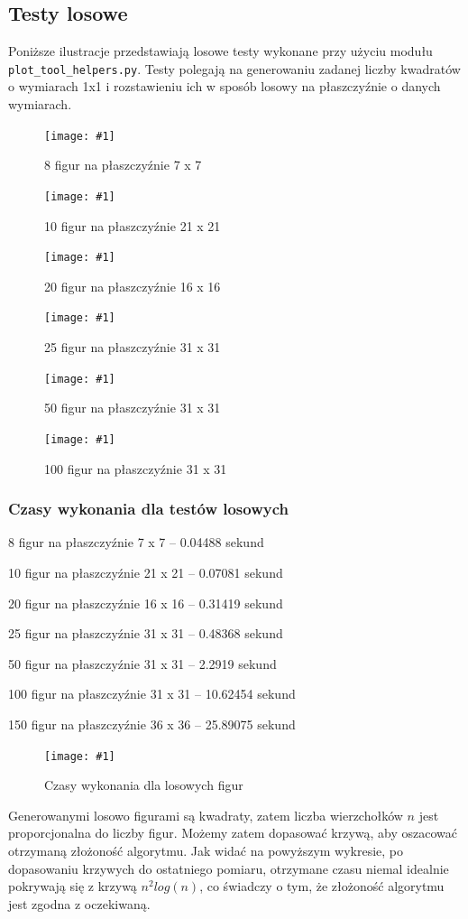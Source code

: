 \documentclass[12pt]{article}
\let\tempone\itemize
\let\temptwo\enditemize
\renewenvironment{itemize}{\tempone\setlength{\itemsep}{0cm}}{\temptwo}
\newcommand{\imgcustomsize}[3]{
	\begin{figure}[H]
		\centering
		\texttt{[image: \#1]}
		\caption{#2}
		\label{#1}
	\end{figure}
}
\begin{document}
		\subsection{Testy losowe}
			Poniższe ilustracje przedstawiają losowe testy wykonane przy użyciu modułu \lstinline|plot_tool_helpers.py|. Testy polegają na generowaniu zadanej liczby kwadratów o wymiarach 1x1 i rozstawieniu ich w sposób losowy na płaszczyźnie o danych wymiarach.
			
			\imgcustomsize{test-losowe1.jpg}{8 figur na płaszczyźnie 7 x 7}{1}
			\imgcustomsize{test-losowe2.jpg}{10 figur na płaszczyźnie 21 x 21}{1}
			\imgcustomsize{test-losowe3.jpg}{20 figur na płaszczyźnie 16 x 16}{1}
			\imgcustomsize{test-losowe4.jpg}{25 figur na płaszczyźnie 31 x 31}{1}
			\imgcustomsize{test-losowe5.jpg}{50 figur na płaszczyźnie 31 x 31}{1}
			\imgcustomsize{test-losowe6.jpg}{100 figur na płaszczyźnie 31 x 31}{1}
		
		\subsubsection{Czasy wykonania dla testów losowych} \label{sssec:times}
			\begin{itemize}
				\item 8 figur na płaszczyźnie 7 x 7 -- 0.04488 sekund
				\item 10 figur na płaszczyźnie 21 x 21 -- 0.07081 sekund
				\item 20 figur na płaszczyźnie 16 x 16 -- 0.31419 sekund
				\item 25 figur na płaszczyźnie 31 x 31 -- 0.48368 sekund
				\item 50 figur na płaszczyźnie 31 x 31 -- 2.2919 sekund
				\item 100 figur na płaszczyźnie 31 x 31 -- 10.62454 sekund
				\item 150 figur na płaszczyźnie 36 x 36 -- 25.89075 sekund
			\end{itemize}
			
			\imgcustomsize{pomiary.jpg}{Czasy wykonania dla losowych figur}{0.75}
			
			Generowanymi losowo figurami są kwadraty, zatem liczba wierzchołków $ n $ jest proporcjonalna do liczby figur. Możemy zatem dopasować krzywą, aby oszacować otrzymaną złożoność algorytmu. Jak widać na powyższym wykresie, po dopasowaniu krzywych do ostatniego pomiaru, otrzymane czasu niemal idealnie pokrywają się z krzywą $ n^2 log(n) $, co świadczy o tym, że złożoność algorytmu jest zgodna z oczekiwaną.  
			\newpage
			
\end{document}
